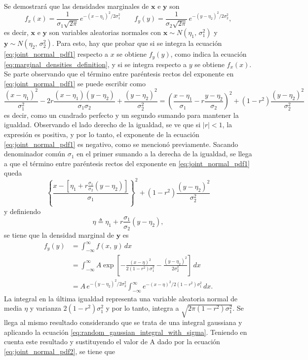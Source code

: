 \documentclass[a4paper]{report}
\newcommand{\x}{\mathbf{x}}
\newcommand{\y}{\mathbf{y}}
\begin{document}
Se demostrará que las densidades marginales de \(\x\) e \(\y\) son
\[
 f_x(x)=\frac{1}{\sigma_1\sqrt{2\pi}}\,e^{-(x-\eta_1)^2/2\sigma_1^2}\qquad
 f_y(y)=\frac{1}{\sigma_2\sqrt{2\pi}}\,e^{-(y-\eta_2)^2/2\sigma_2^2},
\]
es decir, \(\x\) e \(\y\) son variables aleatorias normales con \(\x\sim N(\eta_1,\,\sigma_1^2)\) y \(\y\sim N(\eta_2,\,\sigma_2^2)\). Para esto, hay que probar que si se integra la ecuación \ref{eq:joint_normal_pdf1} respecto a \(x\) se obtiene \(f_y(y)\), como indica la ecuación \ref{eq:marginal_densities_definition}, y si se integra respecto a \(y\) se obtiene \(f_x(x)\). Se parte observando que el término entre paréntesis rectos del exponente en \ref{eq:joint_normal_pdf1} se puede escribir como
\[
 \frac{(x-\eta_1)^2}{\sigma_1^2}-2r\frac{(x-\eta_1)(y-\eta_2)}{\sigma_1\sigma_2}+\frac{(y-\eta_2)^2}{\sigma_2^2}
 =\left(\frac{x-\eta_1}{\sigma_1}-r\frac{y-\eta_2}{\sigma_2}\right)^2+(1-r^2)\frac{(y-\eta_2)^2}{\sigma_2^2}
\]
es decir, como un cuadrado perfecto y un segundo sumando para mantener la igualdad. Observando el lado derecho de la igualdad, se ve que si \(|r|<1\), la expresión es positiva, y por lo tanto, el exponente de la ecuación \ref{eq:joint_normal_pdf1} es negativo, como se mencionó previamente. Sacando denominador común \(\sigma_1\) en el primer sumando a la derecha de la igualdad, se llega a que el término entre paréntesis rectos del exponente en \ref{eq:joint_normal_pdf1} queda
\begin{equation}\label{eq:joint_normal_pdf_exponent}
 \left\{\frac{x-\left[\eta_1+r\frac{\sigma_1}{\sigma_2}(y-\eta_2)\right]}{\sigma_1}\right\}^2+(1-r^2)\frac{(y-\eta_2)^2}{\sigma_2^2}
\end{equation}
y definiendo 
\[
 \eta\triangleq \eta_1+r\frac{\sigma_1}{\sigma_2}(y-\eta_2),
\]
se tiene que la densidad marginal de \(\y\) es
\begin{align*}
 f_y(y)&=\int_{-\infty}^{\infty}f(x,\,y)\,dx\\
   &=\int_{-\infty}^{\infty}A\exp\left[-\frac{(x-\eta)^2}{2(1-r^2)\sigma_1^2}-\frac{(y-\eta_2)^2}{2\sigma_2^2}\right]\,dx\\
   &=A\,e^{-(y-\eta_2)^2/2\sigma_2^2} \int_{-\infty}^{\infty} e^{-(x-\eta)^2/2(1-r^2)\sigma_1^2}\,dx.
\end{align*}
La integral en la última igualdad representa una variable aleatoria normal de media \(\eta\) y varianza \(2(1-r^2)\sigma_1^2\) y por lo tanto, integra a \(\sqrt{2\pi(1-r^2)\sigma_1^2}\). Se llega al mismo resultado considerando que se trata de una integral gaussiana y aplicando la ecuación \ref{eq:random_gaussian_integral_with_sigma}. Teniendo en cuenta este resultado y sustituyendo el valor de A dado por la ecuación \ref{eq:joint_normal_pdf2}, se tiene que
\end{document}
